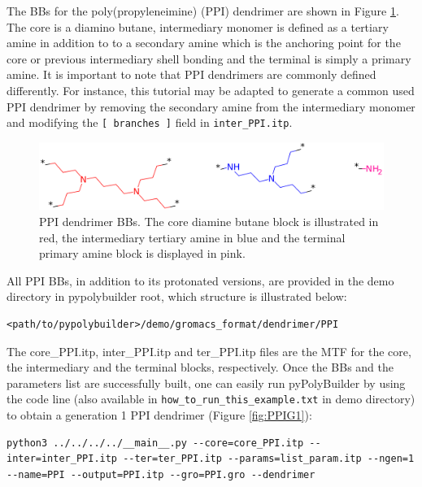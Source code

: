 
The BBs for the poly(propyleneimine) (PPI) dendrimer are shown in Figure \ref{fig:PPIBB}.
The core is a diamino butane, intermediary monomer is defined as a tertiary amine in addition to to a secondary amine which is the anchoring point for the core or previous intermediary shell bonding and the terminal is simply a primary amine.
It is important to note that PPI dendrimers are commonly defined differently.
For instance, this tutorial may be adapted to generate a common used PPI dendrimer by removing the secondary amine from the intermediary monomer and modifying the \texttt{[ branches ]} field in \texttt{inter\_PPI.itp}.

\begin{figure}
    \centering
    \includegraphics[width=\textwidth]{PPI/PPIBBs.png}
    \caption{PPI dendrimer BBs.
             The core diamine butane block is illustrated in red, the intermediary tertiary amine in blue and the terminal primary amine block is displayed in pink.}
    \label{fig:PPIBB}
\end{figure}

All PPI BBs, in addition to its protonated versions, are provided in the demo directory in pypolybuilder root, which structure is illustrated below:
\begin{lstlisting}
<path/to/pypolybuilder>/demo/gromacs_format/dendrimer/PPI
\end{lstlisting}

The core\_PPI.itp, inter\_PPI.itp and ter\_PPI.itp files are the MTF for the core, the intermediary and the terminal blocks, respectively.
Once the BBs and the parameters list are successfully built, one can easily run pyPolyBuilder by using the code line (also available in \texttt{how\_to\_run\_this\_example.txt} in demo directory) to obtain a generation 1 PPI dendrimer (Figure \ref{fig:PPIG1}):

\begin{lstlisting}
python3 ../../../../__main__.py --core=core_PPI.itp --inter=inter_PPI.itp --ter=ter_PPI.itp --params=list_param.itp --ngen=1 --name=PPI --output=PPI.itp --gro=PPI.gro --dendrimer
\end{lstlisting}

